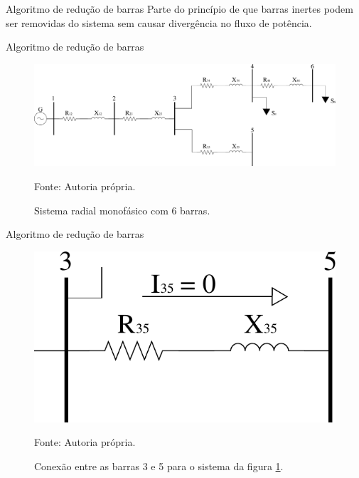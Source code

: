 \documentclass[10pt]{beamer}
\begin{document}
\begin{frame}{Algoritmo de redução de barras}
    Parte do princípio de que barras inertes podem ser removidas do sistema sem causar divergência no fluxo de potência.
\end{frame}

\begin{frame}{Algoritmo de redução de barras}
    \begin{figure}[h]
      \centering
      \caption{Sistema radial monofásico com 6 barras.}
      \includegraphics[width=\textwidth]{img/barreduc}
      \label{fig:barreduc}
      
      \small Fonte: Autoria própria.
    \end{figure}
\end{frame}

\begin{frame}{Algoritmo de redução de barras}
 \begin{figure}[h]
   \centering
   \caption{Conexão entre as barras 3 e 5 para o sistema da figura \ref{fig:barreduc}.}
   \includegraphics[scale=0.7]{img/barreduc1}
   \label{fig:barreduc1}
   
   \small Fonte: Autoria própria.
  \end{figure}
\end{frame}
\end{document}
